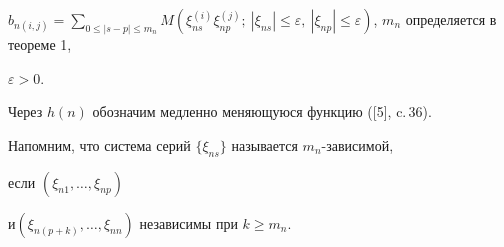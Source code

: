 $b_{n(i,j)}=\sum\limits_{0\le|s-p|\le m_n} 


M(\xi^{(i)}_{ns}\xi^{(j)}_{np};\ |\xi_{ns}|\le\varepsilon,\ 


|\xi_{np}|\le \varepsilon)$, $m_n$ определяется в теореме 1, 


$\varepsilon>0$. 


Через $h(n)$ обозначим медленно меняющуюся функцию ([5], c.\,36). 


 


Напомним, что система серий $\{\xi_{ns}\}$ называется $m_n$-зависимой, 


если $(\xi_{n1},\dotsc,\xi_{np})$ 


и\linebreak $(\xi_{n(p+k)},\dotsc,\xi_{nn})$ независимы при $k\ge m_n$. 


 


